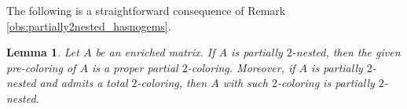 \documentclass[12pt]{book}
\theoremstyle{plain}
\newtheorem{lema}[teo]{Lemma}
\theoremstyle{remark}
\begin{document}
\begin{comment}
		& 0 \textcolor{red}{1} \textcolor{red}{1} 0 0  \cr
	\textbf L & \textcolor{red}{1} \textcolor{red}{1} \textcolor{red}{1} 0 0 \cr
	\textbf{LR} & 0 0 0 0 0 \cr
	\textbf R & 0 0 0 \textcolor{blue}{1} \textcolor{blue}{1}  }\
	\begin{matrix}
	\\ \\ \\ \\ \\ \textcolor{red}{\bullet} \\ \textcolor{blue}{\bullet} \\ \textcolor{blue}{\bullet}
	\end{matrix}
	&&
	B+^{(2)} = \bordermatrix{ & \cr
	\textbf{L} & \textcolor{red}{1} 0 0 0 0 0 0 \cr
	\textbf{L} & \textcolor{blue}{1} \textcolor{blue}{1} 0 0 0 1 0 \cr
	\textbf{R} & 0 0 0 0 \textcolor{red}{1} 1 0 \cr
	\textbf{L} & \textcolor{red}{1} \textcolor{red}{1} \textcolor{red}{1} 0 0 0 1 \cr
	\textbf{R} & 0 0 0\textcolor{blue}{1}  \textcolor{blue}{1} 0 1 \cr
					 & 0 \textcolor{red}{1} \textcolor{red}{1} 0 0 0 0 \cr
	\textbf L & \textcolor{red}{1} \textcolor{red}{1} \textcolor{red}{1}0 0 0 0  \cr
	\textbf R & 0 0 0 \textcolor{blue}{1} \textcolor{blue}{1} 0 0 }\
	\begin{matrix}
	\\ \\ \\ \\ \\ \\ \\ \textcolor{red}{\bullet} \\ \textcolor{blue}{\bullet} \\ 
	\end{matrix}
\end{align*}
\caption{Example of a proper and a non-proper $2$-coloring extension of $B$ and $B+$, respectively. The last two colums of $B+$ are $c_{r_2}$ and $c_{r_3}$.} \label{fig:example_B_extensioncoloring}
\end{figure}
\end{comment}

The following is a straightforward consequence of Remark \ref{obs:partially2nested_hasnogems}.

\begin{lema}\label{lema:part2nested_is_2_colored}
	Let $A$ be an enriched matrix. If $A$ is partially $2$-nested, then the given pre-coloring of $A$ is a proper partial $2$-coloring. %
	Moreover, if $A$ is partially $2$-nested and admits a total $2$-coloring, then $A$ with such $2$-coloring is partially $2$-nested.
\end{lema}
\end{document}
